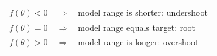 \documentclass[border=12pt]{standalone}
\begin{document}
\color{weeknavy}
\begin{tabular}{rcl}
$f(\theta)<0$ & $\Longrightarrow$ & model range is shorter: undershoot\\[3pt]
$f(\theta)=0$ & $\Longrightarrow$ & model range equals target: root\\[3pt]
$f(\theta)>0$ & $\Longrightarrow$ & model range is longer: overshoot
\end{tabular}
\end{document}
